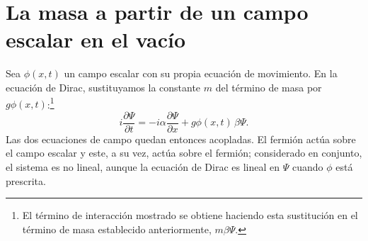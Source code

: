 \begin{classroomqa}
\end{classroomqa}

\section{La masa a partir de un campo escalar en el vacío}

\begin{classroomqa}
\end{classroomqa}

Sea \(\phi(x,t)\) un campo escalar con su propia ecuación de movimiento. En la ecuación de Dirac, sustituyamos la constante \(m\) del término de masa por \(g\phi(x,t)\):\footnote{El término de interacción mostrado se obtiene haciendo esta sustitución en el término de masa establecido anteriormente, \(m\beta\Psi\).}
\begin{equation}
i\frac{\partial\Psi}{\partial t}
=
-i\alpha\frac{\partial\Psi}{\partial x}
+g\phi(x,t)\,\beta\Psi.
\end{equation}
Las dos ecuaciones de campo quedan entonces acopladas. El fermión actúa sobre el campo escalar y este, a su vez, actúa sobre el fermión; considerado en conjunto, el sistema es no lineal, aunque la ecuación de Dirac es lineal en \(\Psi\) cuando \(\phi\) está prescrita.


